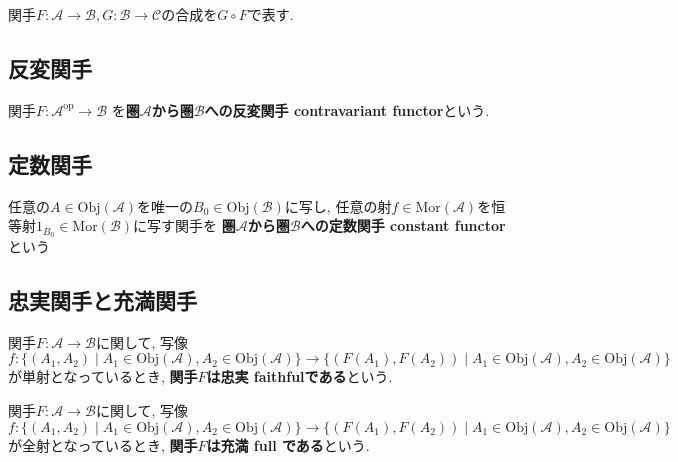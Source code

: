 \begin{Notation}
関手$F:\mathscr{A}\rightarrow\mathscr{B},G:\mathscr{B}\rightarrow\mathscr{C}$の合成を$G\circ F$で表す.
\end{Notation}
\begin{comment}
\begin{example}
順序を保存する写像
\end{example}
\end{comment}
\begin{comment}
\begin{example}
圏と見做した順序集合間の簡単な関手の例
\end{example}
\end{comment}
\begin{comment}
*************************
\begin{example}
$n$次ホモロジー関手
\end{example}
***************************
\end{comment}

\subsection{反変関手}
\begin{Def}
関手$F:\mathscr{A}^{\mathrm{op}}\rightarrow\mathscr{B}$
を{\bf 圏$\mathscr{A}$から圏$\mathscr{B}$への反変関手 contravariant functor}という.
\end{Def}
\subsection{定数関手}
\begin{Def}
任意の$A\in\mathrm{Obj}(\mathscr{A})$を唯一の$B_0\in\mathrm{Obj}(\mathscr{B})$に写し,
任意の射$f\in\mathrm{Mor}(\mathscr{A})$を恒等射$1_{B_0}\in\mathrm{Mor}(\mathscr{B})$に写す関手を
{\bf 圏$\mathscr{A}$から圏$\mathscr{B}$への定数関手 constant functor}という
\end{Def}

\subsection{忠実関手と充満関手}
\begin{Def}
関手$F:\mathscr{A}\rightarrow\mathscr{B}$に関して,
写像
\[f:\{(A_1,A_2)\mid A_1\in\mathrm{Obj}(\mathscr{A}),A_2\in\mathrm{Obj}(\mathscr{A})\}\rightarrow\{(F(A_1),F(A_2))\mid A_1\in\mathrm{Obj}(\mathscr{A}),A_2\in\mathrm{Obj}(\mathscr{A})\}\]
が単射となっているとき,
{\bf 関手$F$は忠実 faithfulである}という.
\end{Def}
\begin{Def}
関手$F:\mathscr{A}\rightarrow\mathscr{B}$に関して,
写像
\[f:\{(A_1,A_2)\mid A_1\in\mathrm{Obj}(\mathscr{A}),A_2\in\mathrm{Obj}(\mathscr{A})\}\rightarrow\{(F(A_1),F(A_2))\mid A_1\in\mathrm{Obj}(\mathscr{A}),A_2\in\mathrm{Obj}(\mathscr{A})\}\]
が全射となっているとき,
{\bf 関手$F$は充満 full である}という.
\end{Def}

